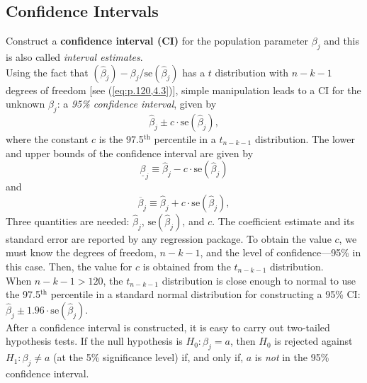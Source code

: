 \documentclass[a4paper, 10pt]{article}
\theoremstyle{definition}	%
\begin{document}
\subsection{Confidence Intervals}
Construct a \textbf{confidence interval (CI)} for the population parameter $\beta_j$ and this is also called \textit{interval estimates}.\\
Using the fact that $(\hat{\beta}_j)-\beta_j/\text{se}(\hat{\beta}_j)$ has a $t$ distribution with $n - k - 1$ degrees of freedom [see (\ref{eq:p.120,4.3})], simple manipulation leads to a CI for the unknown $\beta_j$: a \textit{95\% confidence interval}, given by 
\begin{equation}
    \hat{\beta}_j \pm c \cdot \text{se}(\hat{\beta}_j), \label{eq:p.135,4.16}
\end{equation}
where the constant $c$ is the 97.5$^\text{th}$ percentile in a $t_{n-k-1}$ distribution.
The lower and upper bounds of the confidence interval are given by
\begin{equation*}
    \underline{\beta}_j \equiv \hat{\beta}_j - c \cdot \text{se}(\hat{\beta}_j)
\end{equation*}
and 
\begin{equation*}
    \overline{\beta}_j \equiv \hat{\beta}_j + c \cdot \text{se}(\hat{\beta}_j),
\end{equation*}
Three quantities are needed: $\hat{\beta}_j$, $\text{se}(\hat{\beta}_j)$, and $c$. The coefficient estimate and its standard error are reported by any regression package. To obtain the value $c$, we must know the degrees of freedom, $n - k - 1$, and the level of confidence—95\% in this case. Then, the value for $c$ is obtained from the $t_{n-k-1}$ distribution.\\
When $n - k - 1 > 120$, the $t_{n-k-1}$ distribution is close enough to normal to use the 97.5$^\text{th}$ percentile in a standard normal distribution for constructing a 95\% CI:
$\hat{\beta}_j \pm 1.96 \cdot \text{se}(\hat{\beta}_j).$\\
After a confidence interval is constructed, it is easy to carry out two-tailed hypothesis tests. If the null hypothesis is $H_0: \beta_j = a$, then $H_0$ is rejected against $H_1: \beta_j \neq a$ (at the 5\% significance level) if, and only if, $a$ is \textit{not} in the 95\% confidence interval.
\end{document}
